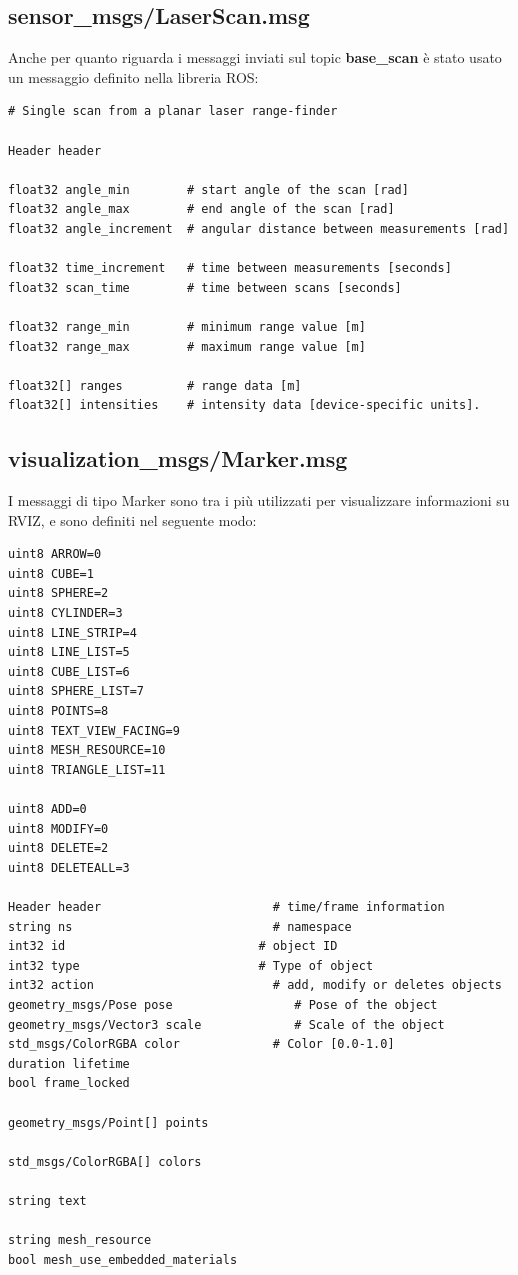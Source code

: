 \documentclass[Lau, binding=0.6cm, oneside]{sapthesis}
\begin{document}
\subsection{sensor\_msgs/LaserScan.msg}
Anche per quanto riguarda i messaggi inviati sul topic \textbf{base\_scan} è stato usato un messaggio definito nella libreria ROS\cite{fonte6}:
\begin{lstlisting}
# Single scan from a planar laser range-finder

Header header

float32 angle_min        # start angle of the scan [rad]
float32 angle_max        # end angle of the scan [rad]
float32 angle_increment  # angular distance between measurements [rad]

float32 time_increment   # time between measurements [seconds]
float32 scan_time        # time between scans [seconds]

float32 range_min        # minimum range value [m]
float32 range_max        # maximum range value [m]

float32[] ranges         # range data [m]
float32[] intensities    # intensity data [device-specific units].
\end{lstlisting}

\subsection{visualization\_msgs/Marker.msg}
I messaggi di tipo Marker sono tra i più utilizzati per visualizzare informazioni su RVIZ, e sono definiti nel seguente modo\cite{fonte7}:
\begin{lstlisting}
uint8 ARROW=0
uint8 CUBE=1
uint8 SPHERE=2
uint8 CYLINDER=3
uint8 LINE_STRIP=4
uint8 LINE_LIST=5
uint8 CUBE_LIST=6
uint8 SPHERE_LIST=7
uint8 POINTS=8
uint8 TEXT_VIEW_FACING=9
uint8 MESH_RESOURCE=10
uint8 TRIANGLE_LIST=11

uint8 ADD=0
uint8 MODIFY=0
uint8 DELETE=2
uint8 DELETEALL=3

Header header                        # time/frame information
string ns                            # namespace
int32 id                           # object ID
int32 type                         # Type of object
int32 action                         # add, modify or deletes objects
geometry_msgs/Pose pose                 # Pose of the object
geometry_msgs/Vector3 scale             # Scale of the object
std_msgs/ColorRGBA color             # Color [0.0-1.0]
duration lifetime
bool frame_locked

geometry_msgs/Point[] points

std_msgs/ColorRGBA[] colors

string text

string mesh_resource
bool mesh_use_embedded_materials
\end{lstlisting}	
\end{document}

